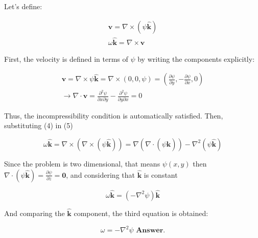 \documentclass[12pt]{article}
\begin{document}
\vspace{-5mm}

Let's define:

\vspace{-5mm}
\begin{eqnarray}
    \mathbf{v} = \nabla \times (\psi \mathbf{\hat{k}})\\ 
    \omega \mathbf{\hat{k}} = \nabla \times \mathbf{v}
\end{eqnarray}

First, the velocity is defined in terms of $\psi$ by writing the components explicitly:

\vspace{-5mm}

\begin{eqnarray}
   \mathbf{v} = \nabla \times\psi \mathbf{\hat{k}} =  \nabla \times(0,0,\psi) = (\frac{\partial \psi}{\partial y}, - \frac{\partial \psi}{\partial x},0)\\
   \rightarrow \nabla \cdot \mathbf{v} = \frac{\partial^2\psi}{\partial x \partial y} - \frac{\partial^2\psi}{\partial y \partial x} = 0
\end{eqnarray}

Thus, the incompressibility condition is automatically satisfied. Then, substituting (4) in (5)

\begin{equation}
    \omega \mathbf{\hat{k}} = \nabla \times (\nabla \times (\psi \mathbf{\hat{k}})) = \nabla(\nabla \cdot (\psi \mathbf{\hat{k}})) -\nabla^2( \psi \mathbf{\hat{k}} )
\end{equation}

Since the problem is two dimensional, that means $\psi(x,y)$ then $\nabla \cdot (\psi \mathbf{\hat{k}}) = \frac{\partial \psi}{\partial z} = \mathbf{0}$, and considering that $\mathbf{\hat{k}}$ is constant

\vspace{-5mm}

\begin{equation}
    \omega \mathbf{\hat{k}} = (-\nabla^2\psi) \mathbf{\hat{k}}
\end{equation}

And comparing the $\mathbf{\hat{k}}$ component, the third equation is obtained:

\vspace{-5mm}

\begin{equation}
    \omega = -\nabla^2\psi \textbf{ Answer.}
\end{equation}
\end{document}
